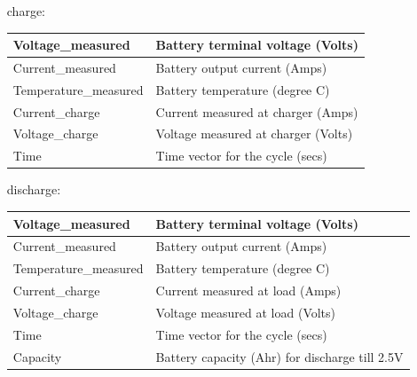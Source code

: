 \documentclass[russian,english,18pt,a4paper,reqno,dviphfm]{article}
\begin{document}
		\begin{itemize}
			\item[charge:]
				\begin{tabular}{ |l|l| }
				  \hline
						Voltage\_measured & Battery terminal voltage (Volts) \\\hline
						Current\_measured & Battery output current (Amps) \\\hline
						Temperature\_measured & Battery temperature (degree C) \\\hline
						Current\_charge & Current measured at charger (Amps) \\\hline
						Voltage\_charge & Voltage measured at charger (Volts) \\\hline
						Time & Time vector for the cycle (secs) \\
				  \hline
				\end{tabular}
			\item[discharge:]
			\begin{tabular}{ |l|l| }
			  \hline
					Voltage\_measured & Battery terminal voltage (Volts) \\\hline
					Current\_measured & Battery output current (Amps) \\\hline
					Temperature\_measured & Battery temperature (degree C) \\\hline
					Current\_charge & Current measured at load (Amps) \\\hline
					Voltage\_charge & Voltage measured at load (Volts) \\\hline
					Time & Time vector for the cycle (secs) \\\hline
					Capacity & Battery capacity (Ahr) for discharge till 2.5V \\
			  \hline
			\end{tabular}
		\end{itemize}
\newpage
\end{document}
